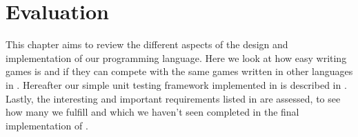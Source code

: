 \chapter{Evaluation}
\label{chap:evaluation}
This chapter aims to review the different aspects of the design and
implementation of our programming language. Here we look at how easy
writing games is and if they can compete with the same games written
in other languages in . Hereafter our simple
unit testing framework implemented in \productname{} is described
in . Lastly, the interesting and important
requirements listed in  are assessed, to see
how many we fulfill and which we haven't seen completed in the final
implementation of \productname{}.




